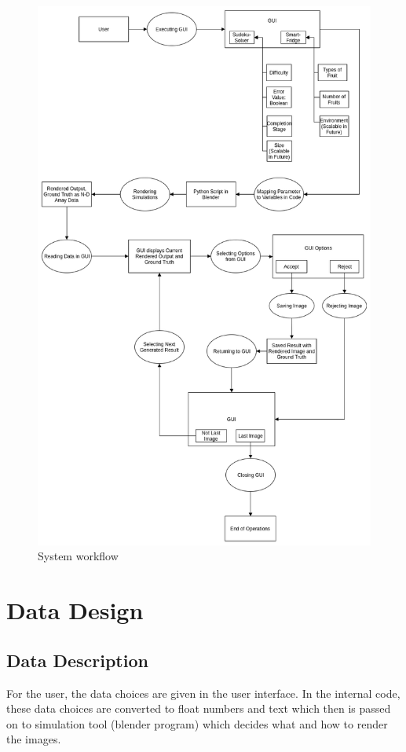 \documentclass[a4paper,12pt]{article}
\begin{document}
\begin{figure}[H]
\includegraphics[scale=0.5]{system_workflow.png}
\caption{System workflow}
\label{workflow}
\end{figure}

\section{Data Design}
\subsection{Data Description}
For the user, the data choices are given in the user interface. In the internal code, these data choices are converted to float numbers and text which then is passed on to simulation tool (blender program) which decides what and how to render the images.
\end{document}
